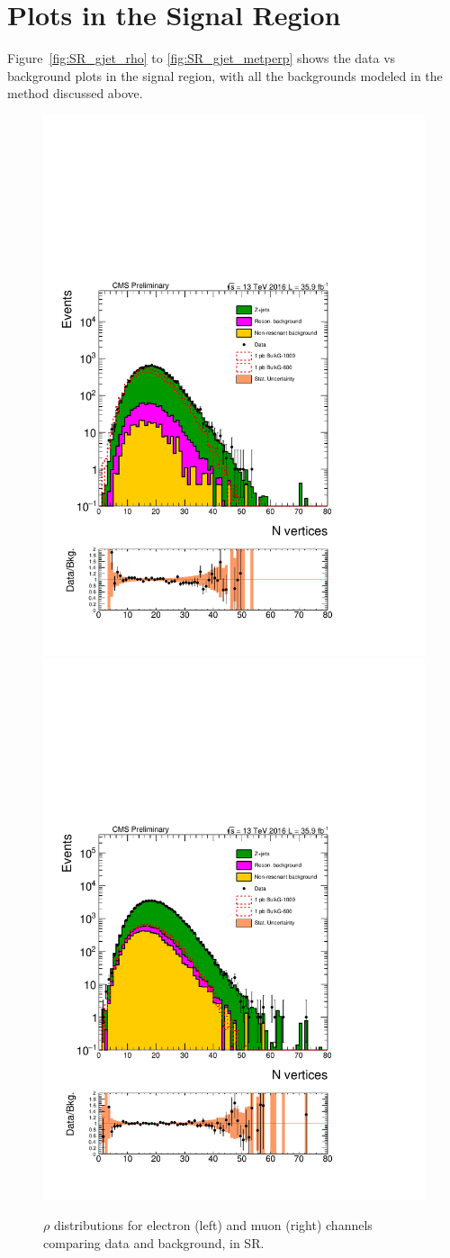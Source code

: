 \section{Plots in the Signal Region}
Figure~\ref{fig:SR_gjet_rho} to \ref{fig:SR_gjet_metperp} shows the data vs background plots in the signal region, with all the backgrounds modeled in the method discussed above. 
\begin{figure}[htbp!]
\centering
\includegraphics[width=0.46\linewidth, page=1]{figures/ReMiniSummer16_DT_PhReMiniMCRcFixXsec_GMCPhPtWt_SRdPhiGT0p5_puWeightsummer16_muoneg_gjet_metfilter_unblind_el_log_1pb.pdf}
\includegraphics[width=0.46\linewidth, page=1]{figures/ReMiniSummer16_DT_PhReMiniMCRcFixXsec_GMCPhPtWt_SRdPhiGT0p5_puWeightsummer16_muoneg_gjet_metfilter_unblind_mu_log_1pb.pdf}
\caption{$\rho$ distributions for electron (left) and muon (right) channels
comparing data and background, in SR.}
\label{fit:SR_gjet_rho}
\end{figure}


